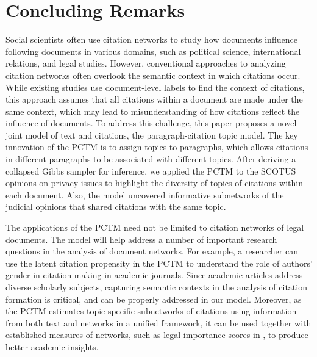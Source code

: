 \section{Concluding Remarks}
\label{sec:conclusion}

Social scientists often use citation networks to study how documents influence following documents in various domains, such as political science, international relations, and legal studies.
However, conventional approaches to analyzing citation networks often overlook the semantic context in which citations occur.
While existing studies use document-level labels to find the context of citations, this approach assumes that all citations within a document are made under the same context, which may lead to misunderstanding of how citations reflect the influence of documents.
To address this challenge, this paper proposes a novel joint model of text and citations, the paragraph-citation topic model.
The key innovation of the PCTM is to assign topics to paragraphs, which allows citations in different paragraphs to be associated with different topics.
After deriving a collapsed Gibbs sampler for inference, we applied the PCTM to the SCOTUS opinions on privacy issues to highlight the diversity of topics of citations within each document.
Also, the model uncovered informative subnetworks of the judicial opinions that shared citations with the same topic.

The applications of the PCTM need not be limited to citation networks of legal documents. 
The model will help address a number of important research questions in the analysis of document networks. 
For example, a researcher can use the latent citation propensity in the PCTM to understand the role of authors' gender in citation making in academic journals. 
Since academic articles address diverse scholarly subjects, capturing semantic contexts in the analysis of citation formation is critical, and can be properly addressed in our model.
Moreover, as the PCTM estimates topic-specific subnetworks of citations using information from both text and networks in a unified framework, it can be used together with established measures of networks, such as legal importance scores in \cite{fowler2007network}, to produce better academic insights. 
